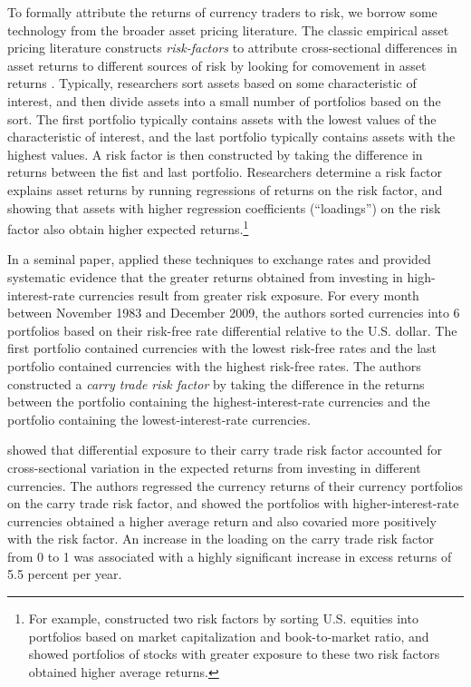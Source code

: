 \documentclass{ar-1col}
\begin{document}
To formally attribute the returns of currency traders to risk, we borrow some technology from the broader asset pricing literature. The classic empirical asset pricing literature constructs \emph{risk-factors} to attribute cross-sectional differences in asset returns to different sources of risk by looking for comovement in asset returns \citep{Fama1976}. Typically, researchers sort assets based on some characteristic of interest, and then divide assets into a small number of portfolios based on the sort. The first portfolio typically contains assets with the lowest values of the characteristic of interest, and the last portfolio typically contains assets with the highest values. A risk factor is then constructed by taking the difference in returns between the fist and last portfolio. Researchers determine a risk factor explains asset returns by running regressions of returns on the risk factor, and showing that assets with higher regression coefficients (``loadings'') on the risk factor also obtain higher expected returns.\footnote{For example, \citet{FamaFrench1992} constructed two risk factors by sorting U.S. equities into portfolios based on market capitalization and book-to-market ratio, and showed portfolios of stocks with greater exposure to these two risk factors obtained higher average returns.}

In a seminal paper, \citet{LustigRoussanovVerdelhan2011} applied these techniques to exchange rates and provided systematic evidence that the greater returns obtained from investing in high-interest-rate currencies result from greater risk exposure. For every month between November 1983 and December 2009, the authors sorted currencies into 6 portfolios based on their risk-free rate differential relative to the U.S. dollar. The first portfolio contained currencies with the lowest risk-free rates and the last portfolio contained currencies with the highest risk-free rates. The authors constructed a \emph{carry trade risk factor} by taking the difference in the returns between the portfolio containing the highest-interest-rate currencies and the portfolio containing the lowest-interest-rate currencies.

\citet{LustigRoussanovVerdelhan2011} showed that differential exposure to their carry trade risk factor accounted for cross-sectional variation in the expected returns from investing in different currencies. The authors regressed the currency returns of their currency portfolios on the carry trade risk factor, and showed the portfolios with higher-interest-rate currencies obtained a higher average return and also covaried more positively with the risk factor. An increase in the loading on the carry trade risk factor from 0 to 1 was associated with a highly significant increase in excess returns of 5.5 percent per year.
\end{document}

